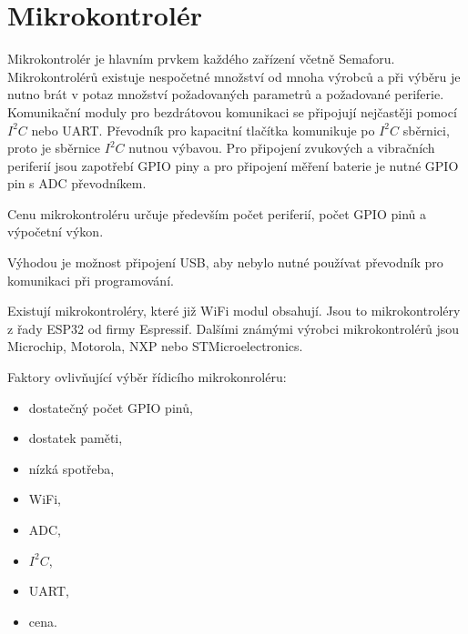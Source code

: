 \section{Mikrokontrolér}
Mikrokontrolér je hlavním prvkem každého zařízení včetně Semaforu. Mikrokontrolérů existuje nespočetné množství od mnoha výrobců a při výběru je nutno brát v potaz
množství požadovaných parametrů a požadované periferie. 
Komunikační moduly pro bezdrátovou komunikaci se připojují nejčastěji pomocí $I^2C$ nebo UART. Převodník pro kapacitní tlačítka komunikuje po $I^2C$ sběrnici, proto je sběrnice
$I^2C$ nutnou výbavou. Pro připojení zvukových a vibračních periferií jsou zapotřebí GPIO piny a pro připojení měření baterie je nutné GPIO pin s ADC převodníkem. 

Cenu mikrokontroléru určuje především počet periferií, počet GPIO pinů a výpočetní výkon.

Výhodou je možnost připojení USB, aby nebylo nutné používat převodník pro komunikaci při programování. 

Existují mikrokontroléry, které již WiFi modul obsahují. Jsou to mikrokontroléry z řady ESP32 od firmy Espressif. Dalšími známými výrobci mikrokontrolérů jsou Microchip,
Motorola, NXP nebo STMicroelectronics. 

Faktory ovlivňující výběr řídicího mikrokonroléru:
\begin{itemize}
  \item dostatečný počet GPIO pinů,
  \item dostatek paměti,
  \item nízká spotřeba,
  \item WiFi,
  \item ADC,
  \item $I^2C$,
  \item UART,
  \item cena.
\end{itemize}







